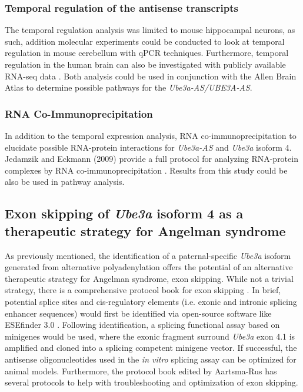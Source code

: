 \subsubsection{Temporal regulation of the antisense transcripts}
The temporal regulation analysis was limited to mouse hippocampal neurons, as such, addition molecular experiments could be conducted to look at temporal regulation in mouse cerebellum with qPCR techniques. Furthermore, temporal regulation in the human brain can also be investigated with publicly available RNA-seq data \cite{Liu2016}. Both analysis could be used in conjunction with the Allen Brain Atlas to determine possible pathways for the \textit{Ube3a-AS/UBE3A-AS}.

\subsubsection{RNA Co-Immunoprecipitation}
In addition to the temporal expression analysis, RNA co-immunoprecipitation to elucidate possible RNA-protein interactions for \textit{Ube3a-AS} and \textit{Ube3a} isoform 4. Jedamzik and Eckmann (2009) provide a full protocol for analyzing RNA-protein complexes by RNA co-immunoprecipitation \cite{Jedamzik2009}. Results from this study could be also be used in pathway analysis.

\subsection{Exon skipping of \textit{Ube3a} isoform 4 as a therapeutic strategy for Angelman syndrome}

As previously mentioned, the identification of a paternal-specific \textit{Ube3a} isoform generated from alternative polyadenylation offers the potential of an alternative therapeutic strategy for Angelman syndrome, exon skipping. While not a trivial strategy, there is a comprehensive protocol book for exon skipping \cite{Aartsma-Rus2012}. In brief, potential splice sites and cis-regulatory elements (i.e. exonic and intronic splicing enhancer sequences) would first be identified via open-source software like ESEfinder 3.0 \cite{Smith2006,Cartegni2003}. Following identification, a splicing functional assay based on minigenes would be used, where the exonic fragment surround \textit{Ube3a} exon 4.1 is amplified and cloned into a splicing competent minigene vector. If successful, the antisense oligonucleotides used in the \textit{in vitro} splicing assay can be optimized for animal models. Furthermore, the protocol book edited by Aartsma-Rus has several protocols to help with troubleshooting and optimization of exon skipping.

